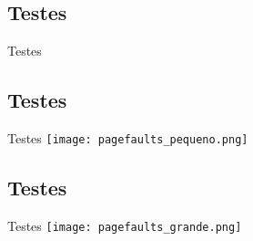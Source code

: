 \documentclass{beamer}
\begin{document}
\subsection{Testes}
\begin{frame}{Testes}
\begin{table}[]
\centering
\caption{Segmentos de Memória}
\label{my-label}
\end{table}
\end{frame}

\subsection{Testes}
\begin{frame}{Testes}
\texttt{[image: pagefaults\_pequeno.png]}
\end{frame}

\subsection{Testes}
\begin{frame}{Testes}
\texttt{[image: pagefaults\_grande.png]}
\end{frame}
\fi
\end{document}
